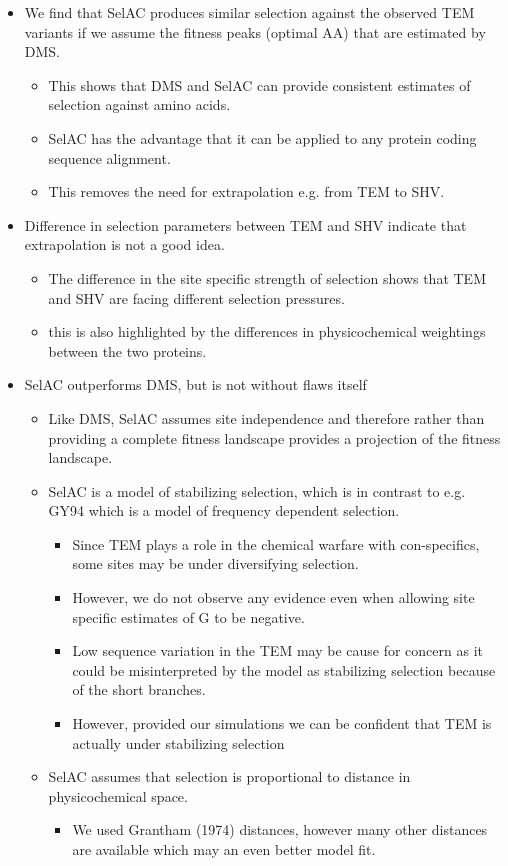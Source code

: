 \documentclass[12pt]{article}
\begin{document}
\begin{itemize}
	\item We find that SelAC produces similar selection against the observed TEM variants  if we assume the fitness peaks (optimal AA) that are estimated by DMS.
	\begin{itemize}
		\item This shows that DMS and SelAC can provide consistent estimates of selection against amino acids.
		\item SelAC has the advantage that it can be applied to any protein coding sequence alignment.
		\item This removes the need for extrapolation e.g. from TEM to SHV.
	\end{itemize}

	\item Difference in selection parameters between TEM and SHV indicate that extrapolation is not a good idea.
	\begin{itemize}
		\item The difference in the site specific strength of selection shows that TEM and SHV are facing different selection pressures.
		\item this is also highlighted by the differences in physicochemical weightings between the two proteins.
	\end{itemize}

	\item SelAC outperforms DMS, but is not without flaws itself
	\begin{itemize}
		\item Like DMS, SelAC assumes site independence and therefore rather than providing a complete fitness landscape provides a projection of the fitness landscape.
		\item SelAC is a model of stabilizing selection, which is in contrast to e.g. GY94 which is a model of frequency dependent selection.
		\begin{itemize}
			\item Since TEM plays a role in the chemical warfare with con-specifics, some sites may be under diversifying selection.
			\item However, we do not observe any evidence even when allowing site specific estimates of G to be negative.
			\item Low sequence variation in the TEM may be cause for concern as it could be misinterpreted by the model as stabilizing selection because of the short branches.
			\item However, provided our simulations we can be confident that TEM is actually under stabilizing selection
		\end{itemize}
		\item SelAC assumes that selection is proportional to distance in physicochemical space. 
		\begin{itemize}
			\item We used Grantham (1974) distances, however many other distances are available which may an even better model fit.
		\end{itemize}
	\end{itemize}


\end{itemize}
\end{document}
